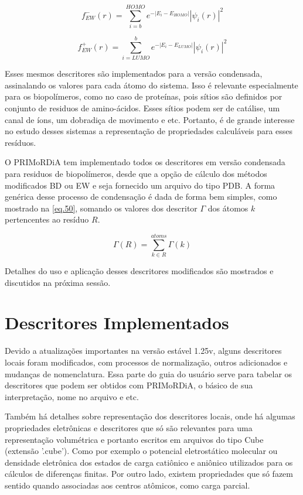\documentclass[a4paper,11pt]{refart}
\begin{document}
\begin{equation}
f^-_{EW}(r) = \sum^{HOMO}_{i=b} e^{-|E_{i}-E_{HOMO}|}|\psi_i(r)|^2
\label{eq.48}
\end{equation}

\begin{equation}
f^+_{EW}(r) =  \sum^{b}_{i=LUMO} e^{-|E_{i}-E_{LUMO}|} |\psi_i(r)|^2
\label{eq.49}
\end{equation}

Esses mesmos descritores são implementados para a versão condensada, assinalando os valores para cada átomo do sistema. Isso é relevante especialmente para os biopolímeros, como no caso de proteínas, pois sítios são definidos por conjunto de residuos de amino-ácidos. Esses sítios podem ser de catálise, um canal de íons, um dobradiça de movimento e etc. Portanto, é de grande interesse no estudo desses sistemas a representação de propriedades calculáveis para esses resíduos. 

O PRIMoRDiA tem implementado todos os descritores em versão condensada para residuos de biopolímeros, desde que a opção de cálculo dos métodos modificados BD ou EW e seja fornecido um arquivo do tipo PDB. A forma genérica desse processo de condensação é dada de forma bem simples, como mostrado na \autoref{eq.50}, somando os valores dos descritor $\Gamma$ dos átomos $k$ pertencentes ao resíduo $R$.

\begin{equation}
\Gamma(R) =  \sum_{k \in R }^{atoms} \Gamma(k)
\label{eq.50}
\end{equation}

Detalhes do uso e aplicação desses descritores modificados são mostrados e discutidos na próxima sessão. 

\newpage
\section{Descritores Implementados} 

Devido a atualizações importantes na versão estável 1.25v, alguns descritores locais foram modificados, com processos de normalização, outros adicionados e mudanças de nomenclatura. Essa parte do guia do usuário serve para tabelar os descritores que podem ser obtidos com PRIMoRDiA, o básico de sua interpretação, nome no arquivo e etc. 

Também há detalhes sobre representação dos descritores locais, onde há algumas propriedades eletrônicas e descritores que só são relevantes para uma representação volumétrica e portanto escritos em arquivos do tipo Cube (extensão '.cube'). Como por exemplo o potencial eletrostático molecular ou densidade eletrônica dos estados de carga catiônico e aniônico utilizados para os cálculos de diferenças finitas. Por outro lado, existem propriedades que só fazem sentido quando associadas aos centros atômicos, como carga parcial. 
\end{document}
